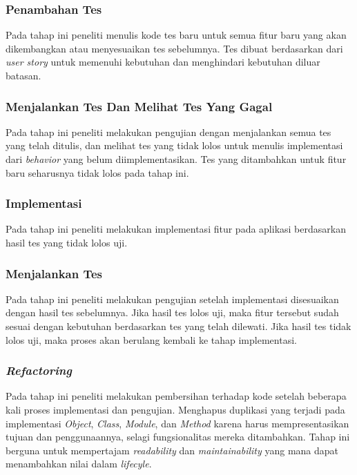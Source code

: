 \begin{spacing}{2}
    \subsubsection{Penambahan Tes}
      Pada tahap ini peneliti menulis kode tes baru untuk semua fitur baru yang akan dikembangkan atau menyesuaikan tes sebelumnya. Tes dibuat berdasarkan dari \emph{user story} untuk memenuhi kebutuhan dan menghindari kebutuhan diluar batasan.

    \subsubsection{Menjalankan Tes Dan Melihat Tes Yang Gagal}
      Pada tahap ini peneliti melakukan pengujian dengan menjalankan semua tes yang telah ditulis, dan melihat tes yang tidak lolos untuk menulis implementasi dari \emph{behavior} yang belum diimplementasikan. Tes yang ditambahkan untuk fitur baru seharusnya tidak lolos pada tahap ini.

    \subsubsection{Implementasi}
      Pada tahap ini peneliti melakukan implementasi fitur pada aplikasi berdasarkan hasil tes yang tidak lolos uji.

    \subsubsection{Menjalankan Tes}
      Pada tahap ini peneliti melakukan pengujian setelah implementasi disesuaikan dengan hasil tes sebelumnya. Jika hasil tes lolos uji, maka fitur tersebut sudah sesuai dengan kebutuhan berdasarkan tes yang telah dilewati. Jika hasil tes tidak lolos uji, maka proses akan berulang kembali ke tahap implementasi.

    \subsubsection{\emph{Refactoring}}
      Pada tahap ini peneliti melakukan pembersihan terhadap kode setelah beberapa kali proses implementasi dan pengujian. Menghapus duplikasi yang terjadi pada implementasi \emph{Object}, \emph{Class}, \emph{Module}, dan \emph{Method} karena harus mempresentasikan tujuan dan penggunaannya, selagi fungsionalitas mereka ditambahkan. Tahap ini berguna untuk mempertajam \emph{readability} dan \emph{maintainability} yang mana dapat menambahkan nilai dalam \emph{lifecyle}.


\end{spacing}
